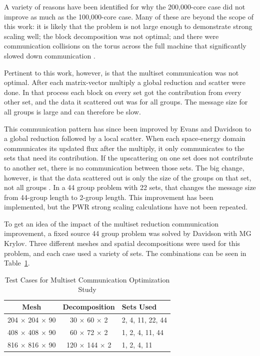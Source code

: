 A variety of reasons have been identified for why the 200,000-core case did not improve as much as the 100,000-core case. Many of these are beyond the scope of this work: it is likely that the problem is not large enough to demonstrate strong scaling well; the block decomposition was not optimal; and there were communication collisions on the torus across the full machine that significantly slowed down communication \cite{Davidson2010}. 

Pertinent to this work, however, is that the multiset communication was not optimal. After each matrix-vector multiply a global reduction and scatter were done. In that process each block on every set got the contribution from every other set, and the data it scattered out was for all groups. The message size for all groups is large and can therefore be slow.

This communication pattern has since been improved by Evans and Davidson to a global reduction followed by a local scatter. When each space-energy domain communicates its updated flux after the multiply, it only communicates to the sets that need its contribution. If the upscattering on one set does not contribute to another set, there is no communication between those sets. The big change, however, is that the data scattered out is only the size of the groups on that set, not all groups \cite{Evans2011b}. In a 44 group problem with 22 sets, that changes the message size from 44-group length to 2-group length. This improvement has been implemented, but the PWR strong scaling calculations have not been repeated. 

To get an idea of the impact of the multiset reduction communication improvement, a fixed source 44 group problem was solved by Davidson with MG Krylov. Three different meshes and spatial decompositions were used for this problem, and each case used a variety of sets. The combinations can be seen in Table~\ref{table:MultisetCommOpt}.
%
\begin{table}[!h]
\caption{Test Cases for Multiset Communication Optimization Study}
\begin{center}
\begin{tabular}{| c | c | l |}
\hline
Mesh & Decomposition & Sets Used \\[0.5ex]
\hline
204 $\times$ 204 $\times$ 90 & 30 $\times$  60 $\times$  2 & 2, 4, 11, 22, 44 \\
408 $\times$ 408 $\times$ 90 & 60 $\times$  72 $\times$  2 & 1, 2, 4, 11, 44 \\
816 $\times$ 816 $\times$ 90 & 120 $\times$  144 $\times$  2 & 1, 2, 4, 11 \\
\hline
\end{tabular}
\end{center}
\label{table:MultisetCommOpt}
\end{table}

